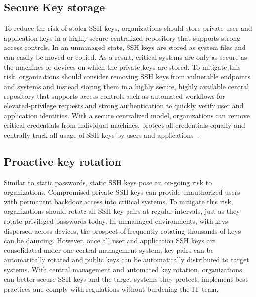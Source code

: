 \subsection{Secure Key storage}
To reduce the risk of stolen SSH keys, organizations should store 
private user and application keys in a highly-secure
centralized repository that supports strong access controls.
In an unmanaged state, SSH keys are stored as system files and can 
easily be moved or copied. As a result, critical systems are only
as secure as the machines or devices on which the private keys are
stored. To mitigate this risk, organizations should consider removing
SSH keys from vulnerable endpoints and systems and instead storing 
them in a highly secure, highly available central repository that 
supports access controls such as automated workflows for 
elevated-privilege requests and strong authentication to quickly 
verify user and application identities. With a secure centralized 
model, organizations can remove critical credentials from individual
machines, protect all credentials equally and centrally track all usage
of SSH keys by users and applications~\cite{hid-sp18-513-gutmann}.
\subsection{Proactive key rotation}
Similar to static passwords, static SSH keys pose an on-going risk
to organizations. Compromised private SSH keys can provide unauthorized
users with permanent backdoor access into critical systems. 
To mitigate this risk, organizations should rotate all SSH key 
pairs at regular intervals, just as they rotate privileged passwords
today. In unmanaged environments, with keys dispersed across devices,
the prospect of frequently rotating thousands of keys can be daunting.
However, once all user and application SSH keys are consolidated under
one central management system, key pairs can be automatically rotated
and public keys can be automatically distributed to target systems. 
With central management and automated key rotation, organizations can
better secure SSH keys and the target systems they protect, 
implement best practices and comply with regulations without burdening
the IT team\cite{hid-sp18-513-gutmann}.

